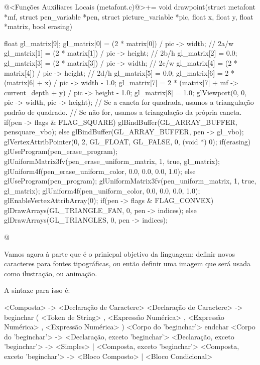 {{{{{{\iniciocodigo
@<Funções Auxiliares Locais (metafont.c)@>+=
void drawpoint(struct metafont *mf, struct pen_variable *pen,
               struct picture_variable *pic, float x, float y, float *matrix,
               bool erasing){
  float gl_matrix[9];
  gl_matrix[0] = (2 * matrix[0]) /  pic -> width;  // 2a/w
  gl_matrix[1] = (2 * matrix[1]) /  pic -> height; // 2b/h
  gl_matrix[2] = 0.0;
  gl_matrix[3] = (2 * matrix[3]) /  pic -> width;  // 2c/w
  gl_matrix[4] = (2 * matrix[4]) /  pic -> height; // 2d/h
  gl_matrix[5] = 0.0;
  gl_matrix[6] = 2 * (matrix[6] + x) /  pic -> width - 1.0;
  gl_matrix[7] = 2 * (matrix[7] + mf -> current_depth + y) / pic -> height -
                 1.0;
  gl_matrix[8] = 1.0;
  glViewport(0, 0, pic -> width, pic -> height); 
  // Se a caneta for quadrada, usamos a triangulação padrão de quadrado.
  // Se não for, usamos a triangulação da própria caneta.
  if(pen -> flags & FLAG_SQUARE)
    glBindBuffer(GL_ARRAY_BUFFER, pensquare_vbo);
  else 
    glBindBuffer(GL_ARRAY_BUFFER, pen -> gl_vbo);
  glVertexAttribPointer(0, 2, GL_FLOAT, GL_FALSE, 0, (void *) 0);
  if(erasing){
    glUseProgram(pen_erase_program);
    glUniformMatrix3fv(pen_erase_uniform_matrix, 1, true, gl_matrix);
    glUniform4f(pen_erase_uniform_color, 0.0, 0.0, 0.0, 1.0);
  }
  else{
    glUseProgram(pen_program);
    glUniformMatrix3fv(pen_uniform_matrix, 1, true, gl_matrix);
    glUniform4f(pen_uniform_color, 0.0, 0.0, 0.0, 1.0);
  }
  glEnableVertexAttribArray(0);
  if(pen -> flags & FLAG_CONVEX)
    glDrawArrays(GL_TRIANGLE_FAN, 0, pen -> indices);
  else
    glDrawArrays(GL_TRIANGLES, 0, pen -> indices);
  
}
@
\fimcodigo


Vamos agora à parte que é o prinicpal objetivo da linguagem: definir
novos caracteres para fontes tipográficas, ou então definir uma imagem
que será usada como ilustração, ou animação.

A sintaxe para isso é:

\alinhaverbatim
<Composta> -> <Declaração de Caractere>
<Declaração de Caractere> -> beginchar ( <Token de String> ,
                                         <Expressão Numérica> ,
                                         <Expressão Numérica> ,
                                         <Expressão Numérica> )
                             <Corpo do 'beginchar'>
                             endchar
<Corpo do 'beginchar'> -> <Declaração, exceto 'beginchar'>
<Declaração, exceto 'beginchar'> -> <Simples> | <Composta, exceto 'beginchar'>
<Composta, exceto 'beginchar'> -> <Bloco Composto> | <Bloco Condicional>
\alinhanormal

}}}}}}
